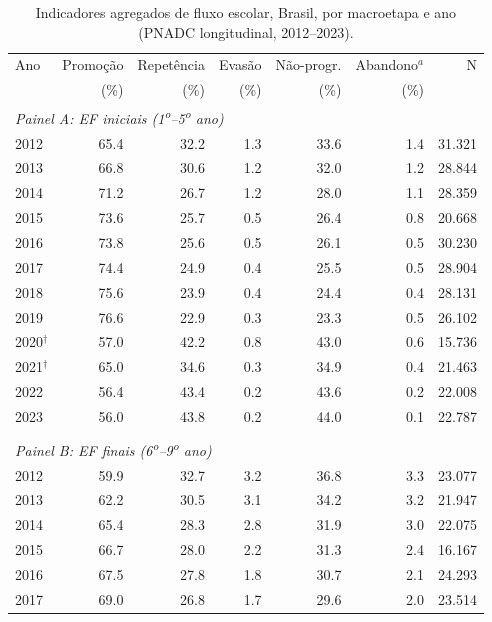 \begin{table}[htbp]
\centering
\caption{Indicadores agregados de fluxo escolar, Brasil, por macroetapa e ano (PNADC longitudinal, 2012--2023).}
\label{tab:t1_brasil}
\begin{threeparttable}
\small
\begin{tabular}{lrrrrrr}
\toprule
Ano & Promoção & Repetência & Evasão & Não-progr. & Abandono$^{a}$ & N \\
    & (\%)     & (\%)        & (\%)   & (\%)        & (\%)             &   \\
\midrule
\multicolumn{7}{l}{\textit{Painel A: EF iniciais (1\textsuperscript{o}--5\textsuperscript{o} ano)}} \\
\midrule
2012 & 65.4 & 32.2 & 1.3 & 33.6 & 1.4 & 31.321 \\
2013 & 66.8 & 30.6 & 1.2 & 32.0 & 1.2 & 28.844 \\
2014 & 71.2 & 26.7 & 1.2 & 28.0 & 1.1 & 28.359 \\
2015 & 73.6 & 25.7 & 0.5 & 26.4 & 0.8 & 20.668 \\
2016 & 73.8 & 25.6 & 0.5 & 26.1 & 0.5 & 30.230 \\
2017 & 74.4 & 24.9 & 0.4 & 25.5 & 0.5 & 28.904 \\
2018 & 75.6 & 23.9 & 0.4 & 24.4 & 0.4 & 28.131 \\
2019 & 76.6 & 22.9 & 0.3 & 23.3 & 0.5 & 26.102 \\
2020$^{\dagger}$ & 57.0 & 42.2 & 0.8 & 43.0 & 0.6 & 15.736 \\
2021$^{\dagger}$ & 65.0 & 34.6 & 0.3 & 34.9 & 0.4 & 21.463 \\
2022 & 56.4 & 43.4 & 0.2 & 43.6 & 0.2 & 22.008 \\
2023 & 56.0 & 43.8 & 0.2 & 44.0 & 0.1 & 22.787 \\
\\[0.3em]
\multicolumn{7}{l}{\textit{Painel B: EF finais (6\textsuperscript{o}--9\textsuperscript{o} ano)}} \\
\midrule
2012 & 59.9 & 32.7 & 3.2 & 36.8 & 3.3 & 23.077 \\
2013 & 62.2 & 30.5 & 3.1 & 34.2 & 3.2 & 21.947 \\
2014 & 65.4 & 28.3 & 2.8 & 31.9 & 3.0 & 22.075 \\
2015 & 66.7 & 28.0 & 2.2 & 31.3 & 2.4 & 16.167 \\
2016 & 67.5 & 27.8 & 1.8 & 30.7 & 2.1 & 24.293 \\
2017 & 69.0 & 26.8 & 1.7 & 29.6 & 2.0 & 23.514 \\

\end{tabular}
\end{threeparttable}
\end{table}
